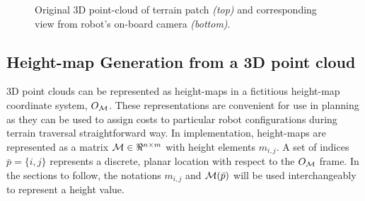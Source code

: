 				\begin{figure}[!h]
					\centering
					\caption{Original 3D point-cloud of terrain patch \emph{(top)} and corresponding view from robot's on-board camera \emph{(bottom)}.}
					\label{fig::pointcloud_terrain_patch}
				\end{figure}


		\subsection{Height-map Generation from a 3D point cloud}
			
			3D point clouds can be represented as height-maps in a fictitious height-map coordinate system, $O_{{\cal M}}$. These representations are convenient for use in planning as they can be used to assign costs to particular robot configurations during terrain traversal straightforward way. In implementation, height-maps are represented as a matrix ${\cal M}\in \Re^{n\times m}$ with height elements $m_{i,j}$. A set of indices $\bar{p} = \{i,j\}$ represents a discrete, planar location with respect to the $O_{{\cal M}}$ frame. In the sections to follow, the notations $m_{i,j}$ and ${\cal M}(\bar{p})$ will be used interchangeably to represent a height value. 

